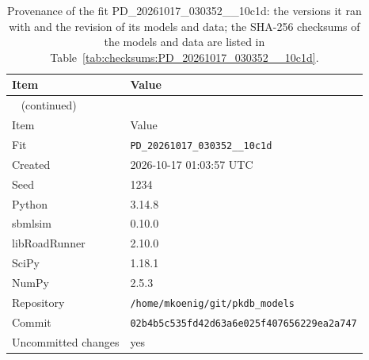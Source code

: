 \documentclass{article}
\begin{document}
\begin{longtable}{ll}
\caption{Provenance of the fit PD\_20261017\_030352\_\_10c1d: the versions it ran with and the revision of its models and data; the SHA-256 checksums of the models and data are listed in Table~\ref{tab:checksums:PD_20261017_030352__10c1d}.}\label{tab:provenance:PD_20261017_030352__10c1d} \\
\toprule
Item & Value \\
\midrule
\endfirsthead
\multicolumn{2}{l}{\small\tablename~\thetable{} (continued)} \\
\toprule
Item & Value \\
\midrule
\endhead
\bottomrule
\endlastfoot
Fit & \texttt{PD\_20261017\_030352\_\_10c1d} \\
Created & 2026-10-17 01:03:57 UTC \\
Seed & 1234 \\
Python & 3.14.8 \\
sbmlsim & 0.10.0 \\
libRoadRunner & 2.10.0 \\
SciPy & 1.18.1 \\
NumPy & 2.5.3 \\
Repository & \texttt{/home/mkoenig/git/pkdb\_models} \\
Commit & \texttt{02b4b5c535fd42d63a6e025f407656229ea2a747} \\
Uncommitted changes & yes \\
\end{longtable}



\end{document}
